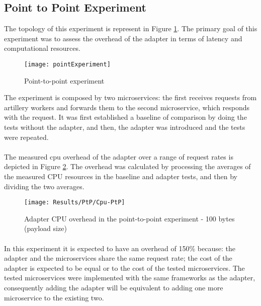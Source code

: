 \subsection{Point to Point Experiment}

The topology of this experiment is represent in Figure \ref{fig:point}.
The primary goal of this experiment was to assess the overhead of the adapter in terms of latency and computational resources.

\begin{figure}[htbp]
    \centering
    \centerline{\texttt{[image: pointExperiment]}}
    \caption{Point-to-point experiment}
    \label{fig:point}
\end{figure}

The experiment is composed by two microservices:
the first receives requests from artillery workers and forwards them to the second microservice, which responds with the request.
It was first established a baseline of comparison
by doing the tests without the adapter, and then, the adapter was introduced and the tests were repeated.

\paragraph{}

The measured cpu overhead of the adapter over a
range of request rates is depicted in Figure \ref{fig:cpuPtp}.
The overhead was calculated by processing the averages of the measured CPU resources in the baseline and adapter tests, and then by dividing the two averages.

\begin{figure}[htbp]
    \centering
    \centerline{\texttt{[image: Results/PtP/Cpu-PtP]}}
    \caption{Adapter CPU overhead in the point-to-point experiment - 100 bytes (payload size)}
    \label{fig:cpuPtp}
\end{figure}

\paragraph{}

In this experiment it is expected to have an overhead of 150\% because: the adapter and the microservices share the same request rate;
the cost of the adapter is expected to be equal or to the cost of the tested microservices.
The tested microservices were implemented with the same frameworks as the adapter, consequently adding the adapter will be equivalent to adding one more microservice to the existing two.


